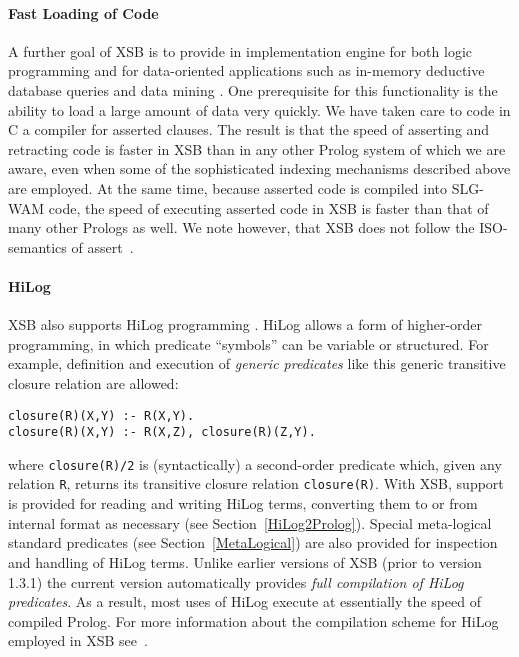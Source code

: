 \paragraph{Fast Loading of Code}  A further goal of XSB is to provide
in implementation engine for both logic programming and for
data-oriented applications such as in-memory deductive database
queries and data mining \cite{SaSw94}.  One prerequisite for this
functionality is the ability to load a large amount of data very
quickly.  We have taken care to code in C a compiler for asserted
clauses.  The result is that the speed of asserting and retracting
code is faster in XSB than in any other Prolog system of which we are
aware, even when some of the sophisticated indexing mechanisms
described above are employed.  At the same time, because asserted code
is compiled into SLG-WAM code, the speed of executing asserted code in
XSB is faster than that of many other Prologs as well.  We note
however, that XSB does not follow the ISO-semantics of
assert~\cite{LiOk87}.

\paragraph{HiLog} XSB also supports HiLog programming
\cite{ChKW93,SaWa95}.  HiLog allows a form of higher-order
programming, in which predicate ``symbols'' can be variable or
structured.  For example, definition and execution of {\em generic
  predicates} like this generic transitive closure relation are
allowed:
\begin{center}
\begin{minipage}{3.7in}
\begin{verbatim}
closure(R)(X,Y) :- R(X,Y).
closure(R)(X,Y) :- R(X,Z), closure(R)(Z,Y).
\end{verbatim}
\end{minipage}
\end{center}
where {\tt closure(R)/2} is (syntactically) a second-order predicate
which, given any relation {\tt R}, returns its transitive closure
relation {\tt closure(R)}.  With XSB, support is provided for reading and
writing HiLog terms, converting them to or from internal format as
necessary (see Section~\ref{HiLog2Prolog}).  Special meta-logical
standard predicates (see Section~\ref{MetaLogical}) are also provided
for inspection and handling of HiLog terms.  Unlike earlier versions
of XSB (prior to version 1.3.1) the current version automatically
provides {\em full compilation of HiLog predicates}.  As a result,
most uses of HiLog execute at essentially the speed of compiled
Prolog.  For more information about the compilation scheme for HiLog
employed in XSB see~\cite{SaWa95}.


